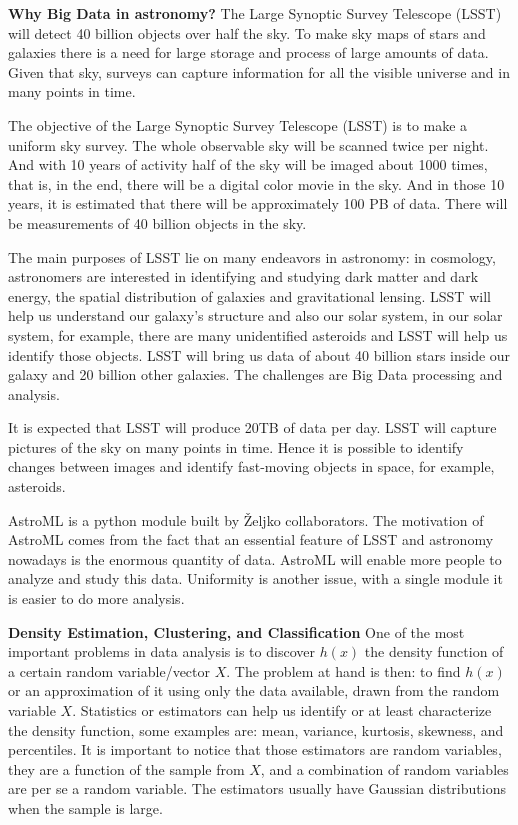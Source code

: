 \documentclass[9pt,a4paper]{article}
\begin{document}
\textbf{Why Big Data in astronomy?} 
The Large Synoptic Survey Telescope (LSST) will detect 40 billion objects over half the sky. 
To make sky maps of stars and galaxies there is a need for large storage and process of large amounts of data. Given that sky, surveys can capture information for all the visible universe and in many points in time. 

The objective of the Large Synoptic Survey Telescope (LSST) is to make a uniform sky survey. The whole observable sky will be scanned twice per night. And with 10 years of activity half of the sky will be imaged about 1000 times, that is, in the end, there will be a digital color movie in the sky. And in those 10 years, it is estimated that there will be approximately 100 PB of data. There will be measurements of 40 billion objects in the sky.

The main purposes of LSST lie on many endeavors in astronomy: in cosmology, astronomers are interested in identifying and studying dark matter and dark energy, the spatial distribution of galaxies and gravitational lensing. LSST will help us understand our galaxy's structure and also our solar system, in our solar system, for example, there are many unidentified asteroids and LSST will help us identify those objects. LSST will bring us data of about 40 billion stars inside our galaxy and 20 billion other galaxies. The challenges are Big Data processing and analysis. 

It is expected that LSST will produce 20TB of data per day. LSST will capture pictures of the sky on many points in time. Hence it is possible to identify changes between images and identify fast-moving objects in space, for example, asteroids. 

AstroML is a python module built by Željko collaborators. The motivation of AstroML comes from the fact that an essential feature of LSST and astronomy nowadays is the enormous quantity of data. AstroML will enable more people to analyze and study this data. Uniformity is another issue, with a single module it is easier to do more analysis. 

\textbf{Density Estimation, Clustering, and Classification} 
One of the most important problems in data analysis is to discover $h(x)$ the density function of a certain random variable/vector $X$. 
The problem at hand is then: to find $h(x)$ or an approximation of it using only the data available, drawn from the random variable $X$.  Statistics or estimators can help us identify or at least characterize the density function, some examples are: mean, variance, kurtosis, skewness, and percentiles. 
It is important to notice that those estimators are random variables, they are a function of the sample from $X$, and a combination of random variables are per se a random variable. 
The estimators usually have Gaussian distributions when the sample is large.
\end{document}
